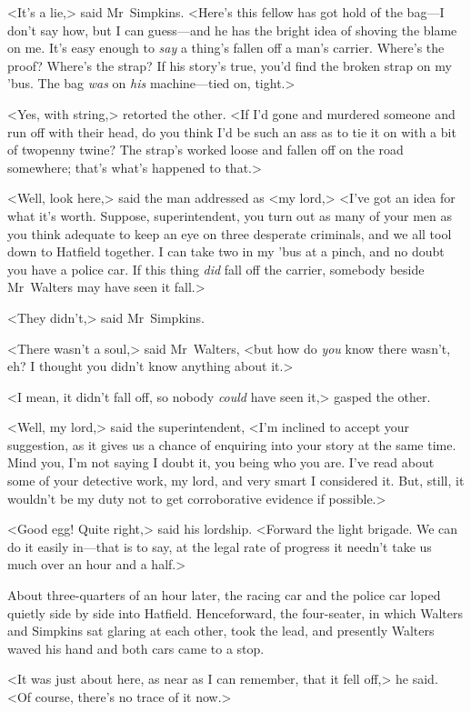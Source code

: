<It's a lie,> said Mr~Simpkins. <Here's this fellow has got hold of the bag—I don't say how, but I can guess—and he has the bright idea of shoving the blame on me. It's easy enough to \emph{say} a thing's fallen off a man's carrier. Where's the proof? Where's the strap? If his story's true, you'd find the broken strap on my 'bus. The bag \emph{was} on \emph{his} machine—tied on, tight.>

<Yes, with string,> retorted the other. <If I'd gone and murdered someone and run off with their head, do you think I'd be such an ass as to tie it on with a bit of twopenny twine? The strap's worked loose and fallen off on the road somewhere; that's what's happened to that.>

<Well, look here,> said the man addressed as <my lord,> <I've got an idea for what it's worth. Suppose, superintendent, you turn out as many of your men as you think adequate to keep an eye on three desperate criminals, and we all tool down to Hatfield together. I can take two in my 'bus at a pinch, and no doubt you have a police car. If this thing \emph{did} fall off the carrier, somebody beside Mr~Walters may have seen it fall.>

<They didn't,> said Mr~Simpkins.

<There wasn't a soul,> said Mr~Walters, <but how do \emph{you} know there wasn't, eh? I thought you didn't know anything about it.>

<I mean, it didn't fall off, so nobody \emph{could} have seen it,> gasped the other.

<Well, my lord,> said the superintendent, <I'm inclined to accept your suggestion, as it gives us a chance of enquiring into your story at the same time. Mind you, I'm not saying I doubt it, you being who you are. I've read about some of your detective work, my lord, and very smart I considered it. But, still, it wouldn't be my duty not to get corroborative evidence if possible.>

<Good egg! Quite right,> said his lordship. <Forward the light brigade. We can do it easily in—that is to say, at the legal rate of progress it needn't take us much over an hour and a half.>

\divider
About three-quarters of an hour later, the racing car and the police car loped quietly side by side into Hatfield. Henceforward, the four-seater, in which Walters and Simpkins sat glaring at each other, took the lead, and presently Walters waved his hand and both cars came to a stop.

<It was just about here, as near as I can remember, that it fell off,> he said. <Of course, there's no trace of it now.>

